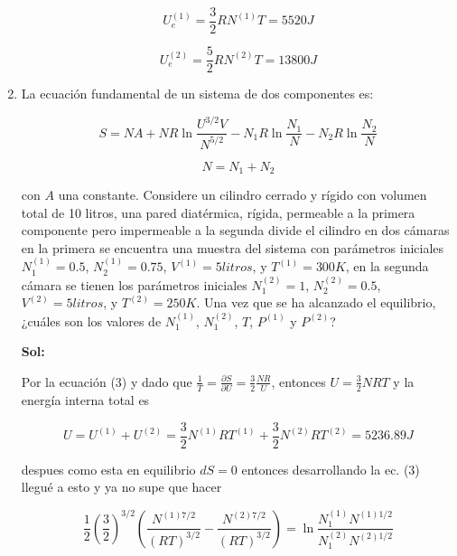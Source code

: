 \documentclass[12pt,a4paper]{article}
\begin{document}
\begin{enumerate}
\begin{equation*}
    U^{(1)}_{e} = \frac{3}{2}R N^{(1)} T = 5520 J
\end{equation*}

\begin{equation*}
    U^{(2)}_{e} = \frac{5}{2} R N^{(2)} T = 13800 J
\end{equation*}








\item La ecuación fundamental de un sistema de dos componentes es:

\begin{equation}
    S = NA + NR \ln{\frac{U^{3/2}V}{N^{5/2}}} - N_1 R \ln{\frac{N_1}{N}} - N_2 R \ln{\frac{N_2}{N}}
\end{equation}

\begin{equation*}
    N = N_1 + N_2
\end{equation*}

con $A$ una constante. Considere un cilindro cerrado y rígido con volumen total de 10 litros, una pared diatérmica, rígida, permeable a la primera componente pero impermeable a la segunda divide el cilindro en dos cámaras en la primera se encuentra una muestra del sistema con parámetros iniciales $N_1^{(1)} = 0.5$, $N_2^{(1)} = 0.75$, $V^{(1)} = 5 litros$, y $T^{(1)}=300K$, en la segunda cámara se tienen los parámetros iniciales $N_1 ^{(2)}= 1$, $N_{2}^{(2)}=0.5$, $V^{(2)} = 5 litros$, y $T^{(2)} = 250K$. Una vez que se ha alcanzado el equilibrio, ¿cuáles son los valores de $N_1^{(1)}$, $N_1^{(2)}$, $T$, $P^{(1)}$ y $P^{(2)}$?

\textbf{Sol:}

Por la ecuación (3) y dado que $\frac{1}{T} = \frac{\partial S}{\partial U} = \frac{3}{2}\frac{NR}{U}$, entonces $U = \frac{3}{2}NRT$ y la energía interna total es

\begin{equation*}
    U = U^{(1)} + U^{(2)} = \frac{3}{2}N^{(1)}RT^{(1)} + \frac{3}{2}N^{(2)}RT^{(2)} = 5236.89 J
\end{equation*}

despues como esta en equilibrio $dS = 0$ entonces desarrollando la ec. (3) llegué a esto y ya no supe que hacer

\begin{equation*}
    \frac{1}{2}\left(\frac{3}{2}\right)^{3/2} \left(\frac{N^{(1)7/2}}{(RT)^{3/2}}- \frac{N^{(2)7/2}}{(RT)^{3/2}}\right) = \ln{\frac{N_{1}^{(1)}N^{(1)1/2}}{N_{1}^{(2)}N^{(2)1/2}}}
\end{equation*}









\end{enumerate}
\end{document}
